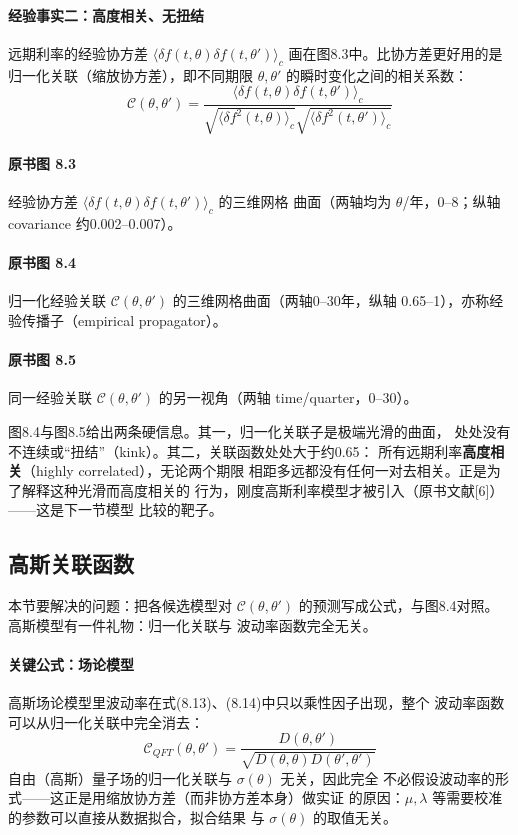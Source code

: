 \paragraph{经验事实二：高度相关、无扭结}
远期利率的经验协方差 $\langle\delta f(t,\theta)\delta f(t,\theta')\rangle_c$
画在图8.3中。比协方差更好用的是归一化关联（缩放协方差），即不同期限
$\theta,\theta'$ 的瞬时变化之间的相关系数：
\begin{equation*}
\mathcal{C}(\theta,\theta')=
\frac{\langle\delta f(t,\theta)\delta f(t,\theta')\rangle_c}
{\sqrt{\langle\delta f^{2}(t,\theta)\rangle_c}
\sqrt{\langle\delta f^{2}(t,\theta')\rangle_c}}
\tag{8.17}
\end{equation*}
\paragraph{原书图 8.3}\quad 经验协方差
$\langle\delta f(t,\theta)\delta f(t,\theta')\rangle_c$ 的三维网格
曲面（两轴均为 $\theta$/年，0--8；纵轴 covariance 约0.002--0.007）。
\paragraph{原书图 8.4}\quad 归一化经验关联
$\mathcal{C}(\theta,\theta')$ 的三维网格曲面（两轴0--30年，纵轴
0.65--1），亦称经验传播子（empirical propagator）。
\paragraph{原书图 8.5}\quad 同一经验关联 $\mathcal{C}(\theta,\theta')$
的另一视角（两轴 time/quarter，0--30）。

图8.4与图8.5给出两条硬信息。其一，归一化关联子是极端光滑的曲面，
处处没有不连续或“扭结”（kink）。其二，关联函数处处大于约0.65：
所有远期利率\textbf{高度相关}（highly correlated），无论两个期限
相距多远都没有任何一对去相关。正是为了解释这种光滑而高度相关的
行为，刚度高斯利率模型才被引入（原书文献[6]）——这是下一节模型
比较的靶子。

\subsection{高斯关联函数}

本节要解决的问题：把各候选模型对 $\mathcal{C}(\theta,\theta')$
的预测写成公式，与图8.4对照。高斯模型有一件礼物：归一化关联与
波动率函数完全无关。

\paragraph{关键公式：场论模型}
高斯场论模型里波动率在式(8.13)、(8.14)中只以乘性因子出现，整个
波动率函数可以从归一化关联中完全消去：
\begin{equation*}
\mathcal{C}_{QFT}(\theta,\theta')=
\frac{D(\theta,\theta')}{\sqrt{D(\theta,\theta)D(\theta',\theta')}}
\tag{8.18}
\end{equation*}
自由（高斯）量子场的归一化关联与 $\sigma(\theta)$ 无关，因此完全
不必假设波动率的形式——这正是用缩放协方差（而非协方差本身）做实证
的原因：$\mu,\lambda$ 等需要校准的参数可以直接从数据拟合，拟合结果
与 $\sigma(\theta)$ 的取值无关。

